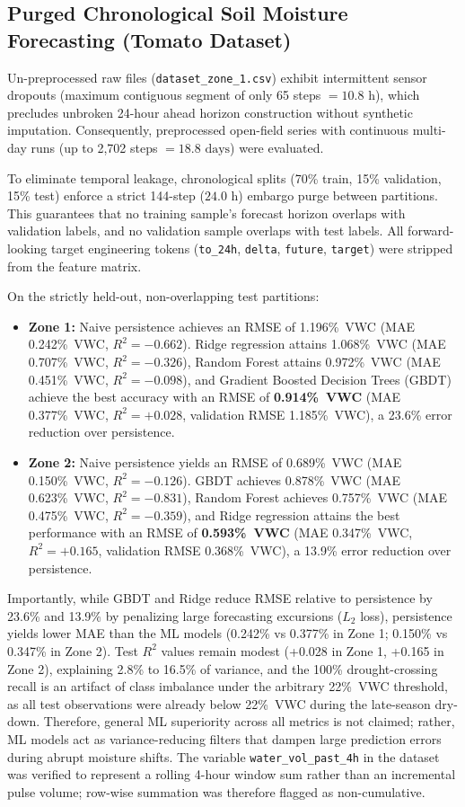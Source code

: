 \documentclass[10pt,twocolumn,a4paper]{article}
\begin{document}
\subsection{Purged Chronological Soil Moisture Forecasting (Tomato Dataset)}
Un-preprocessed raw files (\texttt{dataset\_zone\_1.csv}) exhibit intermittent sensor dropouts (maximum contiguous segment of only 65 steps $= 10.8\text{ h}$), which precludes unbroken 24-hour ahead horizon construction without synthetic imputation. Consequently, preprocessed open-field series with continuous multi-day runs (up to 2,702 steps $= 18.8\text{ days}$) were evaluated.

To eliminate temporal leakage, chronological splits (70\% train, 15\% validation, 15\% test) enforce a strict 144-step ($24.0\text{ h}$) embargo purge between partitions. This guarantees that no training sample's forecast horizon overlaps with validation labels, and no validation sample overlaps with test labels. All forward-looking target engineering tokens (\texttt{to\_24h}, \texttt{delta}, \texttt{future}, \texttt{target}) were stripped from the feature matrix.

On the strictly held-out, non-overlapping test partitions:
\begin{itemize}\setlength{\itemsep}{1pt}\setlength{\parskip}{0pt}
  \item \textbf{Zone 1:} Naive persistence achieves an RMSE of 1.196\%~VWC (MAE 0.242\%~VWC, $R^2 = -0.662$). Ridge regression attains 1.068\%~VWC (MAE 0.707\%~VWC, $R^2 = -0.326$), Random Forest attains 0.972\%~VWC (MAE 0.451\%~VWC, $R^2 = -0.098$), and Gradient Boosted Decision Trees (GBDT) achieve the best accuracy with an RMSE of \textbf{0.914\%~VWC} (MAE 0.377\%~VWC, $R^2 = +0.028$, validation RMSE 1.185\%~VWC), a 23.6\% error reduction over persistence.
  \item \textbf{Zone 2:} Naive persistence yields an RMSE of 0.689\%~VWC (MAE 0.150\%~VWC, $R^2 = -0.126$). GBDT achieves 0.878\%~VWC (MAE 0.623\%~VWC, $R^2 = -0.831$), Random Forest achieves 0.757\%~VWC (MAE 0.475\%~VWC, $R^2 = -0.359$), and Ridge regression attains the best performance with an RMSE of \textbf{0.593\%~VWC} (MAE 0.347\%~VWC, $R^2 = +0.165$, validation RMSE 0.368\%~VWC), a 13.9\% error reduction over persistence.
\end{itemize}
Importantly, while GBDT and Ridge reduce RMSE relative to persistence by 23.6\% and 13.9\% by penalizing large forecasting excursions ($L_2$ loss), persistence yields lower MAE than the ML models (0.242\% vs 0.377\% in Zone 1; 0.150\% vs 0.347\% in Zone 2). Test $R^2$ values remain modest (+0.028 in Zone 1, +0.165 in Zone 2), explaining 2.8\% to 16.5\% of variance, and the 100\% drought-crossing recall is an artifact of class imbalance under the arbitrary 22\%~VWC threshold, as all test observations were already below 22\%~VWC during the late-season dry-down. Therefore, general ML superiority across all metrics is not claimed; rather, ML models act as variance-reducing filters that dampen large prediction errors during abrupt moisture shifts. The variable \texttt{water\_vol\_past\_4h} in the dataset was verified to represent a rolling 4-hour window sum rather than an incremental pulse volume; row-wise summation was therefore flagged as non-cumulative.
\end{document}

